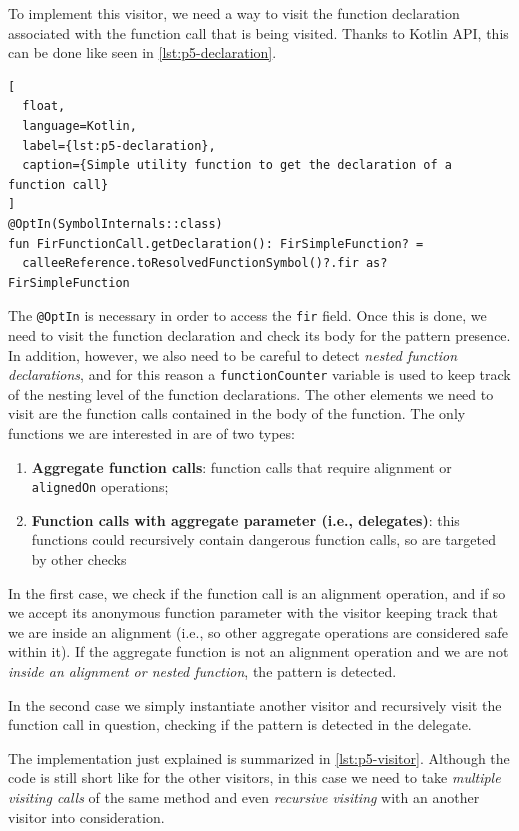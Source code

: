 \documentclass[12pt,a4paper,openright,twoside]{book}
\begin{document}
To implement this visitor, we need a way to visit the function declaration
associated with the function call that is being visited. Thanks to Kotlin API,
this can be done like seen in \cref{lst:p5-declaration}.
%
\begin{lstlisting}[
  float, 
  language=Kotlin,
  label={lst:p5-declaration},
  caption={Simple utility function to get the declaration of a function call}
]
@OptIn(SymbolInternals::class)
fun FirFunctionCall.getDeclaration(): FirSimpleFunction? =
  calleeReference.toResolvedFunctionSymbol()?.fir as? FirSimpleFunction
\end{lstlisting}
%
The \lstinline{@OptIn} is necessary in order to access the \lstinline{fir}
field. Once this is done, we need to visit the function declaration and check
its body for the pattern presence. In addition, however, we also need to be
careful to detect \emph{nested function declarations}, and for this reason 
a \lstinline{functionCounter} variable is used to keep track of the nesting
level of the function declarations. 
%
The other elements we need to visit are the function calls contained in the body
of the function. The only functions we are interested in are of two types:

\begin{enumerate}
  \item \textbf{Aggregate function calls}: function calls that require alignment
  or \lstinline{alignedOn} operations;
  \item \textbf{Function calls with aggregate parameter (i.e., delegates)}: this 
  functions could recursively contain dangerous function calls, so are targeted 
  by other checks
\end{enumerate}

In the first case, we check if the function call is an alignment operation, and if
so we accept its anonymous function parameter with the visitor keeping track that 
we are inside an alignment (i.e., so other aggregate operations are considered safe
within it). If the aggregate function is not an alignment operation and we are not
\emph{inside an alignment or nested function}, the pattern is detected.

In the second case we simply instantiate another visitor and recursively visit the
function call in question, checking if the pattern is detected in the delegate.

The implementation just explained is summarized in \cref{lst:p5-visitor}.
Although the code is still short like for the other visitors, in this case we
need to take \emph{multiple visiting calls} of the same method and even
\emph{recursive visiting} with an another visitor into consideration.
\end{document}
